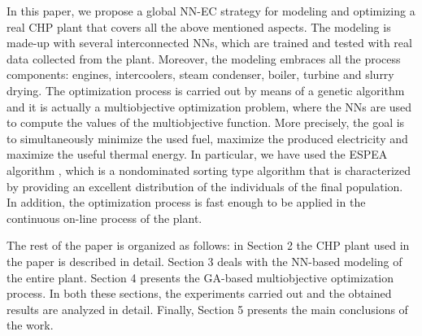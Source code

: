 In this paper, we propose a global NN-EC strategy for modeling and optimizing a real CHP plant that covers all the above mentioned aspects. The modeling is made-up with several interconnected NNs, which are trained and tested with real data collected from the plant. Moreover, the modeling embraces all the process components: engines, intercoolers, steam condenser, boiler, turbine and slurry drying. The optimization process is carried out by means of a genetic algorithm and it is actually a multiobjective optimization problem, where the NNs are used to compute the values of the multiobjective function. More precisely, the goal is to simultaneously minimize the used fuel, maximize the produced electricity and maximize the useful thermal energy. In particular, we have used the ESPEA algorithm \cite{espea}, which is a nondominated sorting type algorithm that is characterized by providing an excellent distribution of the individuals of the final population. In addition, the optimization process is fast enough to be applied in the continuous on-line process of the plant.  

The rest of the paper is organized as follows: in Section 2 the CHP plant used in the paper is described in detail. Section 3 deals with the NN-based modeling of the entire plant. Section 4 presents the GA-based multiobjective optimization process. In both these sections, the experiments carried out and the obtained results are analyzed in detail. Finally, Section 5 presents the main conclusions of the work.
\FloatBarrier